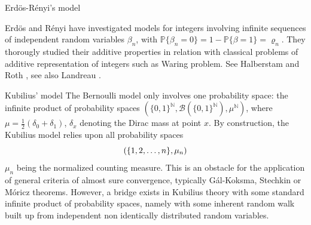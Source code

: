 \documentclass[11pt,draft,reqno]{amsart}
\makeatletter
\def\section{\@startsection{section}{1}%
     \z@{.7\linespacing\@plus\linespacing}{.5\linespacing}%
     {\bfseries%
     \centering
     }}
\theoremstyle{definition}
\theoremstyle{remarks}
\numberwithin{equation}{section}
\def \b{{\beta}}
\def \d{{\delta}}
\def \m{{\mu}}
\def\P{{\mathcal P}}
\def\P{{\mathbb P}}
\def\N{{\mathbb N}}
\makeatother
\begin{document}
  

  
\section{Erd\"os-R\'enyi's model}\label{s5.a}

    Erd\"os and R\'enyi \cite{ER} have   investigated models for integers involving  infinite sequences of  independent   random
variables $\b_n$, with $\P\{\b_n=0\} =1-\P\{\b= 1\}=\varrho_n
$. They thorougly studied
 their additive properties in relation with classical problems of   additive representation  of integers such as Waring problem. See
Halberstam and Roth \cite{HR}, see also Landreau \cite{L}.   

\section{Kubilius' model} The Bernoulli model  only involves  one
probability space: the infinite product of probability spaces      $(\{0,1\}^\N, \mathcal B(\{0,1\}^\N),
\m^\N )$, where  $\m= \frac{1}{2}(\d_{0}+\d_{1})$,  $\d_x$ denoting the Dirac mass at point $x$. By construction,  the Kubilius model  relies upon all
probability spaces
$$\hbox{$(\{ 1,2, \ldots ,n \}, \m_n)$}$$
  $\m_n$ being  the normalized counting measure.
This is an obstacle for the application of general criteria of  almost sure convergence, typically G\'al-Koksma, Stechkin or M\'oricz theorems. 
   However,
     a bridge exists in Kubilius theory with some standard infinite  product of probability  spaces, namely with some inherent random walk built up from
independent non identically distributed random variables. 
\end{document}
